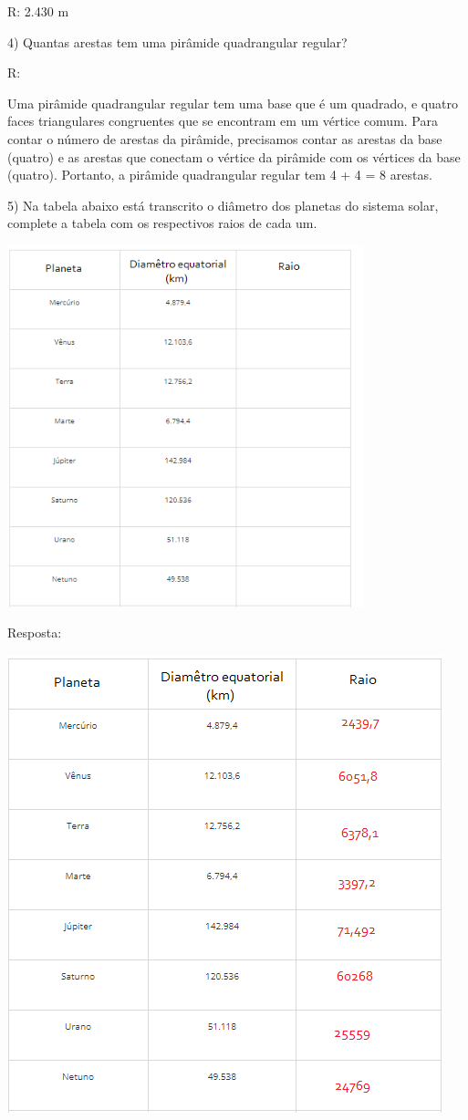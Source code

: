 R: 2.430 m

4) Quantas arestas tem uma pirâmide quadrangular regular?

R:

Uma pirâmide quadrangular regular tem uma base que é um quadrado, e
quatro faces triangulares congruentes que se encontram em um vértice
comum. Para contar o número de arestas da pirâmide, precisamos contar as
arestas da base (quatro) e as arestas que conectam o vértice da pirâmide
com os vértices da base (quatro). Portanto, a pirâmide quadrangular
regular tem 4 + 4 = 8 arestas.

5) Na tabela abaixo está transcrito o diâmetro dos planetas do sistema
solar, complete a tabela com os respectivos raios de cada um.

\includegraphics[width=4.05833in,height=4.13212in]{./imgSAEB_6_MAT/media/image48.png}

Resposta:

\includegraphics[width=4.96875in,height=5.22917in]{./imgSAEB_6_MAT/media/image49.png}

